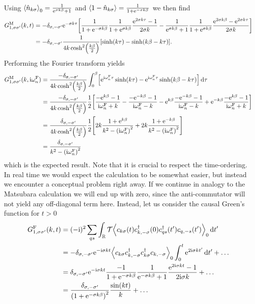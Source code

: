 \documentclass[english, parskip=full]{scrartcl}
\begin{document}
Using $\bra*{\hat{n}_{k\sigma}}_0 = \frac{1}{\powe{\sigma k\beta} + 1}$ and $\bra*{1 - \hat{n}_{k\sigma}} = \frac{1}{1 + \powe{-\sigma k\beta}}$ we then find
\begin{align}
G_{1,\sigma\sigma'}^\M(k,t) &=-\delta_{\sigma,-\sigma'} \powe{-\sigma k\tau} \klb*{\frac{1}{1 + \powe{-\sigma k\beta}} \frac{1}{1 + \powe{\sigma k\beta}} \frac{\powe{2\sigma k\tau} - 1}{2\sigma k} - \frac{1}{\powe{\sigma k\beta} + 1} \frac{1}{1 + \powe{\sigma k\beta}} \frac{\powe{2\sigma k\beta} - \powe{2\sigma k\tau}}{2\sigma k}}\\
&= -\delta_{\sigma,-\sigma'} \frac{1}{4 k\cosh^2\kla*{\frac{k\beta}{2}}} \klb*{\sinh(k\tau) - \sinh(k\beta - k\tau)}.
\end{align}
Performing the Fourier transform yields
\begin{align}
G_{1,\sigma\sigma'}^\M(k,\i\omega_n^\F) &= \frac{-\delta_{\sigma,-\sigma'}}{4k\cosh^2\kla*{\frac{k\beta}{2}}} \intx{0}{\beta}{ \klb*{ \powe{\i\omega_n^\F \tau} \sinh(k\tau) - \powe{\i\omega_n^\F\tau} \sinh(k\beta - k\tau)}}{\tau}\\
&= \frac{-\delta_{\sigma,-\sigma'}}{4k\cosh^2\kla*{\frac{k\beta}{2}}} \frac{1}{2} \klb*{\frac{-\powe{k\beta} - 1}{\i\omega_n^\F + k} - \frac{-\powe{-k\beta} - 1}{\i\omega_n^\F - k} - \powe{k\beta} \frac{-\powe{-k\beta} - 1}{\i\omega_n^\F - k} + \powe{-k\beta} \frac{-\powe{k\beta} - 1}{\i\omega_n^\F + k}}\\
&= \frac{\delta_{\sigma,-\sigma'}}{4k\cosh^2\kla*{\frac{k\beta}{2}}} \frac{1}{2} \klb*{2k \frac{1 + \powe{k\beta}}{k^2 - \kla*{\i\omega_n^\F}^2} + 2k \frac{1 + \powe{-k\beta}}{k^2 - \kla*{\i\omega_n^\F}^2}}\\
&= \frac{\delta_{\sigma,-\sigma'}}{k^2 - \kla*{\i\omega_n^\F}^2}
\end{align}
which is the expected result.
Note that it is crucial to respect the time-ordering.\\
In real time we would expect the calculation to be somewhat easier, but instead we encounter a conceptual problem right away.
If we continue in analogy to the Matsubara calculation we will end up with zero, since the anti-commutator will not yield any off-diagonal term here.
Instead, let us consider the causal Green's function for $t>0$ 
\begin{align}
G_{1,\sigma\sigma'}^\F(k,t) &= (-\i)^2 \sum_{qs} \intr{ \mathcal{T} \bra*{c_{k\sigma}(t) c_{k,-\sigma}^\dagger(0) c_{qs}^\dagger(t') c_{q,-s}(t')}_0}{t'}\\
&= -\delta_{\sigma,-\sigma'} \powe{-\i\sigma kt} \bra*{c_{k\sigma} c_{k,-\sigma}^\dagger c_{k\sigma}^\dagger c_{k,-\sigma}}_0 \intx{0}{t}{ \powe{2\i\sigma kt'} }{t'} + \dots\\
&= \delta_{\sigma,-\sigma'} \powe{-\i \sigma kt} \frac{-1}{1 + \powe{-\sigma k\beta}} \frac{1}{\powe{-\sigma k\beta} + 1} \frac{\powe{2\i\sigma kt} - 1}{2\i\sigma k} + \dots\\
&= \frac{\delta_{\sigma,-\sigma'}}{\kla*{1 + \powe{-\sigma k\beta}}^2} \frac{\sin(kt)}{k} + \dots
\end{align}
\end{document}
